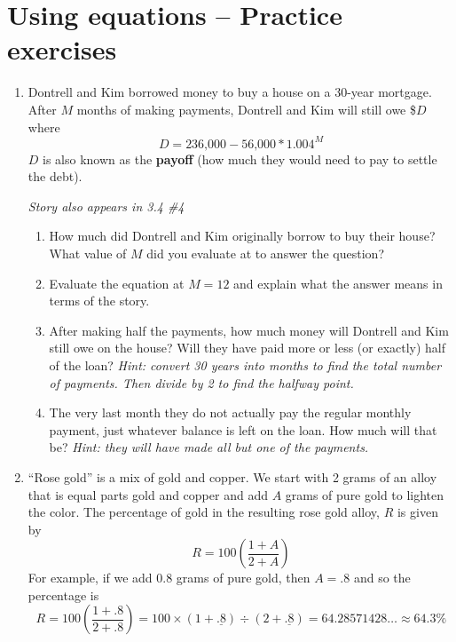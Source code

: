 
\section{Using equations  -- Practice exercises} 

\begin{enumerate}

\item Dontrell and Kim borrowed money to buy a house on a 30-year mortgage.  
After $M$ months of making payments, Dontrell and Kim will still owe \$$D$ where 
$$D=\text{236,000}-\text{56,000} \ast 1.004^M$$  
$D$ is also known as the \textbf{payoff} (how much they would need to pay to settle the debt).

 \hfill \emph{Story also appears in 3.4 \#4}
 \begin{enumerate}
\item How much did Dontrell and Kim originally borrow to buy their house?  What value of $M$ did you evaluate at to answer the question? \vfill
\item Evaluate the equation at $M=12$ and explain what the answer means in terms of the story. \vfill
\item After making half the payments, how much money will Dontrell and Kim still owe on the house?  Will they have paid more or less (or exactly) half of the loan?  \emph{Hint:  convert 30 years into months to find the total number of payments.  Then divide by 2 to find the halfway point.} \vfill
\item The very last month they do not actually pay the regular monthly payment, just whatever balance is left on the loan.  How much will that be? \emph{Hint:  they will have made all but one of the payments.} \vfill
\end{enumerate}

\newpage %

\item ``Rose gold'' is a mix of gold and copper.  We start with 2 grams of an alloy that is equal parts gold and copper and add $A$ grams of pure gold to lighten the color. The percentage of gold in the resulting rose gold alloy, $R$ is given by $$R = 100\left(\frac{1+A}{2+A}\right)$$
For example, if we add 0.8 grams of pure gold, then $A=.8$ and so the percentage is $$R=100\left(\frac{1+.8}{2+.8}\right)= 100 \times (1 + \underline{.8})\div(2+\underline{.8})=64.28571428\ldots \approx 64.3\%$$ 


\end{enumerate}
